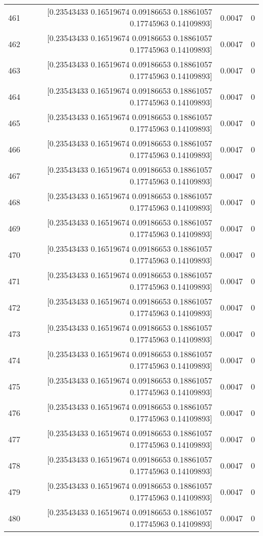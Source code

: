 \begin{longtable}{lrrr}
461 & [0.23543433 0.16519674 0.09186653 0.18861057 0.17745963 0.14109893] & 0.0047 & 0 \\
462 & [0.23543433 0.16519674 0.09186653 0.18861057 0.17745963 0.14109893] & 0.0047 & 0 \\
463 & [0.23543433 0.16519674 0.09186653 0.18861057 0.17745963 0.14109893] & 0.0047 & 0 \\
464 & [0.23543433 0.16519674 0.09186653 0.18861057 0.17745963 0.14109893] & 0.0047 & 0 \\
465 & [0.23543433 0.16519674 0.09186653 0.18861057 0.17745963 0.14109893] & 0.0047 & 0 \\
466 & [0.23543433 0.16519674 0.09186653 0.18861057 0.17745963 0.14109893] & 0.0047 & 0 \\
467 & [0.23543433 0.16519674 0.09186653 0.18861057 0.17745963 0.14109893] & 0.0047 & 0 \\
468 & [0.23543433 0.16519674 0.09186653 0.18861057 0.17745963 0.14109893] & 0.0047 & 0 \\
469 & [0.23543433 0.16519674 0.09186653 0.18861057 0.17745963 0.14109893] & 0.0047 & 0 \\
470 & [0.23543433 0.16519674 0.09186653 0.18861057 0.17745963 0.14109893] & 0.0047 & 0 \\
471 & [0.23543433 0.16519674 0.09186653 0.18861057 0.17745963 0.14109893] & 0.0047 & 0 \\
472 & [0.23543433 0.16519674 0.09186653 0.18861057 0.17745963 0.14109893] & 0.0047 & 0 \\
473 & [0.23543433 0.16519674 0.09186653 0.18861057 0.17745963 0.14109893] & 0.0047 & 0 \\
474 & [0.23543433 0.16519674 0.09186653 0.18861057 0.17745963 0.14109893] & 0.0047 & 0 \\
475 & [0.23543433 0.16519674 0.09186653 0.18861057 0.17745963 0.14109893] & 0.0047 & 0 \\
476 & [0.23543433 0.16519674 0.09186653 0.18861057 0.17745963 0.14109893] & 0.0047 & 0 \\
477 & [0.23543433 0.16519674 0.09186653 0.18861057 0.17745963 0.14109893] & 0.0047 & 0 \\
478 & [0.23543433 0.16519674 0.09186653 0.18861057 0.17745963 0.14109893] & 0.0047 & 0 \\
479 & [0.23543433 0.16519674 0.09186653 0.18861057 0.17745963 0.14109893] & 0.0047 & 0 \\
480 & [0.23543433 0.16519674 0.09186653 0.18861057 0.17745963 0.14109893] & 0.0047 & 0 \\

\end{longtable}
